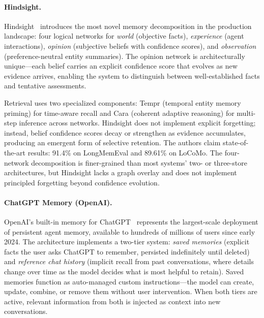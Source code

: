\paragraph{Hindsight.}
Hindsight~\cite{latimer2025hindsight} introduces the most novel memory
decomposition in the production landscape: four logical networks for
\emph{world} (objective facts), \emph{experience} (agent
interactions), \emph{opinion} (subjective beliefs with confidence
scores), and \emph{observation} (preference-neutral entity summaries).
The opinion network is architecturally unique---each belief carries an
explicit confidence score that evolves as new evidence arrives,
enabling the system to distinguish between well-established facts and
tentative assessments.

Retrieval uses two specialized components: Tempr (temporal entity
memory priming) for time-aware recall and Cara (coherent adaptive
reasoning) for multi-step inference across networks. Hindsight does
not implement explicit forgetting; instead, belief confidence scores
decay or strengthen as evidence accumulates, producing an emergent
form of selective retention. The authors claim state-of-the-art
results: 91.4\% on LongMemEval and 89.61\% on LoCoMo. The four-network
decomposition is finer-grained than most systems' two- or three-store
architectures, but Hindsight lacks a graph overlay and does not
implement principled forgetting beyond confidence evolution.

\paragraph{ChatGPT Memory (OpenAI).}
OpenAI's built-in memory for ChatGPT~\cite{openai2024memoryfaq}
represents the largest-scale deployment of persistent agent memory,
available to hundreds of millions of users since early 2024. The
architecture implements a two-tier system: \emph{saved memories}
(explicit facts the user asks ChatGPT to remember, persisted
indefinitely until deleted) and \emph{reference chat history} (implicit
recall from past conversations, where details change over time as the
model decides what is most helpful to retain). Saved memories function
as auto-managed custom instructions---the model can create, update,
combine, or remove them without user intervention. When both tiers are
active, relevant information from both is injected as context into new
conversations.

